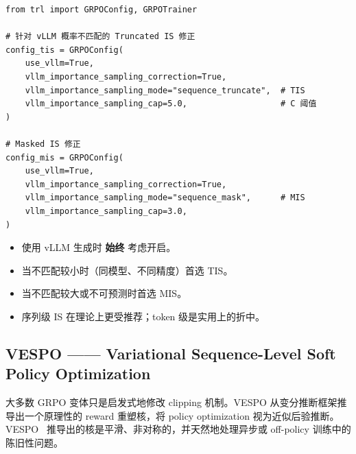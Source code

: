 \begin{examplebox}
\begin{lstlisting}[style=pythonstyle]
from trl import GRPOConfig, GRPOTrainer

# 针对 vLLM 概率不匹配的 Truncated IS 修正
config_tis = GRPOConfig(
    use_vllm=True,
    vllm_importance_sampling_correction=True,
    vllm_importance_sampling_mode="sequence_truncate",  # TIS
    vllm_importance_sampling_cap=5.0,                   # C 阈值
)

# Masked IS 修正
config_mis = GRPOConfig(
    use_vllm=True,
    vllm_importance_sampling_correction=True,
    vllm_importance_sampling_mode="sequence_mask",      # MIS
    vllm_importance_sampling_cap=3.0,
)
\end{lstlisting}
\end{examplebox}

\begin{keybox}
\begin{itemize}
  \item 使用 vLLM 生成时 \textbf{始终} 考虑开启。
  \item 当不匹配较小时（同模型、不同精度）首选 TIS。
  \item 当不匹配较大或不可预测时首选 MIS。
  \item 序列级 IS 在理论上更受推荐；token 级是实用上的折中。
\end{itemize}
\end{keybox}

\subsection{VESPO —— Variational Sequence-Level Soft Policy Optimization}
\label{sec:vespo}

\begin{intuitionbox}[原理性的 Reward 重塑]
大多数 GRPO 变体只是启发式地修改 clipping 机制。VESPO 从变分推断框架推导出一个原理性的 reward 重塑核，将 policy optimization 视为近似后验推断。VESPO~\cite{luo2025vespo} 推导出的核是平滑、非对称的，并天然地处理异步或 off-policy 训练中的陈旧性问题。
\end{intuitionbox}

